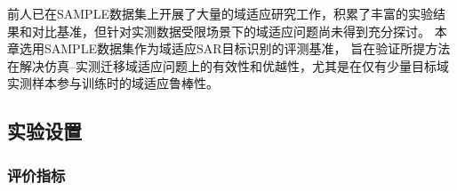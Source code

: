 前人已在SAMPLE数据集上开展了大量的域适应研究工作，积累了丰富的实验结果和对比基准，但针对实测数据受限场景下的域适应问题尚未得到充分探讨。
本章选用SAMPLE数据集作为域适应SAR目标识别的评测基准，
旨在验证所提方法在解决仿真--实测迁移域适应问题上的有效性和优越性，尤其是在仅有少量目标域实测样本参与训练时的域适应鲁棒性。


\subsection{实验设置}


\subsubsection{评价指标}



